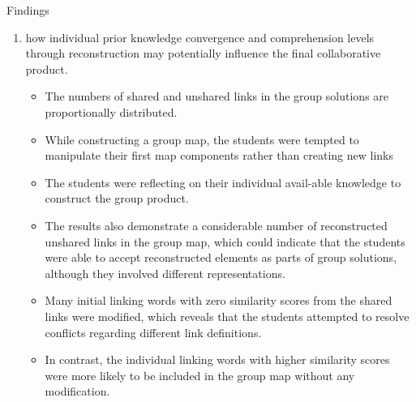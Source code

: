 \begin{frame}[allowframebreaks]{Findings}
\begin{enumerate}
    \item how individual prior knowledge convergence and comprehension 
          levels through reconstruction may potentially influence the final collaborative product.
          \begin{itemize}
            \item The numbers of shared and unshared links in the group solutions are proportionally distributed.
            \item While constructing a group map, the students were tempted to manipulate their first map components rather than creating new links
            \item The students were reflecting on their individual avail-able knowledge to construct the group product.
            \item The results also demonstrate a considerable number of reconstructed unshared links in the group map, which could indicate that the students were able to accept reconstructed elements as parts of group solutions, although they involved different representations. 
            \item Many initial linking words with zero similarity scores from the shared links were modified, which reveals that the students attempted to resolve conflicts regarding different link definitions.  
            \item In contrast, the individual linking words with higher similarity scores were more likely to be included in the group map without any modification.
          \end{itemize}
\end{enumerate}
    
\end{frame}




